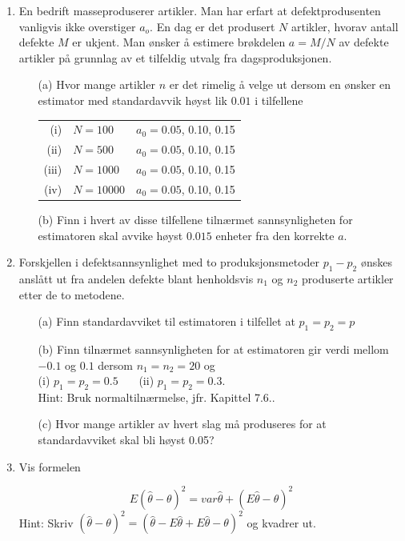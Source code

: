 \begin{enumerate}
\item En bedrift masseproduserer artikler. Man har erfart at
defektprodusenten vanligvis ikke overstiger $a_o$. En dag er
det produsert $N$ artikler, hvorav antall defekte $M$ er
ukjent. Man ønsker å estimere brøkdelen $a=M/N$ av defekte
artikler på grunnlag av et tilfeldig utvalg fra dagsproduksjonen.
\begin{itemize}
\item[(a)] Hvor mange artikler $n$ er det rimelig å velge ut
dersom en ønsker en estimator med standardavvik høyst
lik $0.01$ i tilfellene
\begin{center}
\begin{tabular}{rll}
(i)  &  $N=100$  &  $a_0=0.05$, 0.10, 0.15\\
(ii) &  $N=500$  &  $a_0=0.05$, 0.10, 0.15\\
(iii)&  $N=1000$ &   $a_0=0.05$, 0.10, 0.15\\
(iv) &  $N=10000$ &  $a_0=0.05$, 0.10, 0.15
\end{tabular}
\end{center}
\item[(b)] Finn i hvert av disse tilfellene tilnærmet
   sannsynligheten for estimatoren skal avvike høyst
   $0.015$ enheter fra den korrekte $a$.
\end{itemize}

\item  Forskjellen i defektsannsynlighet med to produksjonsmetoder 
$p_1 - p_2$ ønskes anslått ut fra andelen defekte blant henholdsvis
 $n_1$ og $n_2$ produserte artikler etter de to metodene.
\begin{itemize}
\item[(a)] Finn standardavviket til estimatoren i tilfellet at $p_1=p_2=p$
\item[(b)] Finn tilnærmet sannsynligheten for at estimatoren gir
verdi mellom $-0.1$ og $0.1$ dersom $n_1=n_2=20$ og \\
(i) $p_1=p_2=0.5$  \ \ \   (ii) $p_1=p_2=0.3$. \\
Hint: Bruk normaltilnærmelse, jfr. Kapittel 7.6..
\item[(c)] Hvor mange artikler av hvert slag må produseres for at 
standardavviket skal bli høyst 0.05?
\end{itemize}

\item Vis formelen

 \[E(\hat{\theta} - \theta)^2=var\hat{\theta}+(E\hat{\theta}-\theta)^2 \]
Hint: Skriv ${(\hat{\theta} - \theta)}^2={(\hat{\theta} -
E\hat{\theta} + E\hat{\theta} - \theta)}^2$ og kvadrer ut.


\end{enumerate}
